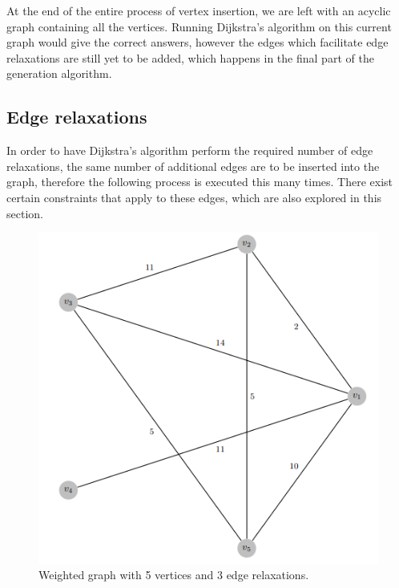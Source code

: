\documentclass{l4proj}
\begin{document}
At the end of the entire process of vertex insertion, we are left with an acyclic graph containing all the vertices. Running Dijkstra's algorithm on this current graph would give the correct answers, however the edges which facilitate edge relaxations are still yet to be added, which happens in the final part of the generation algorithm.

\subsection{Edge relaxations}
\label{sec:er}

In order to have Dijkstra's algorithm perform the required number of edge relaxations, the same number of additional edges are to be inserted into the graph, therefore the following process is executed this many times. There exist certain constraints that apply to these edges, which are also explored in this section.

\begin{figure}
    \centering
    \includegraphics[width=0.6\linewidth]{images/relaxWeight.png}    

    \caption{Weighted graph with 5 vertices and 3 edge relaxations.}
    \label{fig:relaxWeight} 
\end{figure}
\end{document}
